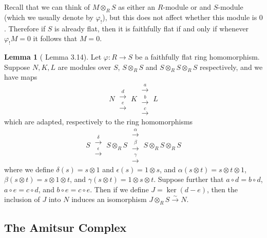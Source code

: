 \documentclass[oneside,11pt]{amsart}
\theoremstyle{definition}
\newtheorem{proof techniques}{Proof Techniques}
\newtheorem{lemma}{Lemma}
\begin{document}
Recall that we can think of $M \otimes_R S$ as either an $R$-module or and $S$-module (which we usually denote by $\varphi_!$), but this does not affect whether this module is $0$. Therefore if $S$ is already flat, then it is faithfully flat if and only if whenever $\varphi_! M  = 0$ it follows that $M = 0$.


\begin{lemma}[\cite{demazure-gabriel1980} Lemma 3.14]\label{lem: DG Lemma 3.14}
Let $\varphi: R \to S$ be a faithfully flat ring homomorphism. Suppose $N , K , L$ are modules over $S$, $S \otimes_R S$ and $S \otimes_R S \otimes_R S$ respectively, and we have maps
\begin{equation*}
N \ \substack{\overset{d}{\longrightarrow} \\ \overset{e}{\longrightarrow}}  \ K \ \substack{\overset{a}{\longrightarrow} \\ \overset{b}{\longrightarrow} \\ \overset{c}{\longrightarrow}} \ L
\end{equation*}
which are adapted, respectively to the ring homomorphisms 
\begin{equation*}
S \ \substack{\overset{\delta}{\longrightarrow} \\ \overset{\epsilon}{\longrightarrow}}  \ S \otimes_R S \ \substack{\overset{\alpha}{\longrightarrow} \\ \overset{\beta}{\longrightarrow} \\ \overset{\gamma}{\longrightarrow}} \ S \otimes_R S \otimes_R S
\end{equation*}
where we define $\delta(s) = s \otimes 1$ and $\epsilon(s) = 1 \otimes s$, and $\alpha(s \otimes t) = s \otimes t \otimes 1$, $\beta(s \otimes t) = s \otimes 1 \otimes t$, and $\gamma(s \otimes t) = 1 \otimes s \otimes t$. 
Suppose further that $a \circ d = b \circ d$, $a \circ e = c \circ d$, and $b \circ e = c \circ e$. Then if we define $J = \ker(d - e)$, then the inclusion of $J$ into $N$ induces an isomorphism $J \otimes_R S \overset{\sim}{\to} N$.

\end{lemma}


\subsection{The Amitsur Complex}
\end{document}
